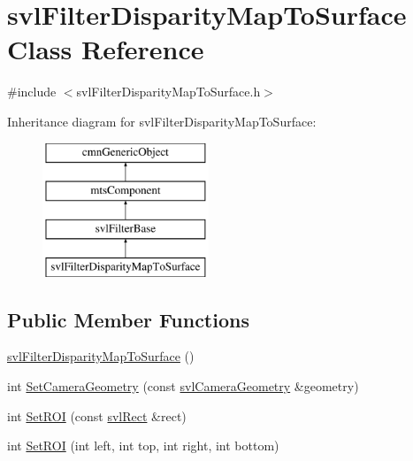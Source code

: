 \hypertarget{classsvl_filter_disparity_map_to_surface}{}\section{svl\+Filter\+Disparity\+Map\+To\+Surface Class Reference}
\label{classsvl_filter_disparity_map_to_surface}


{\ttfamily \#include $<$svl\+Filter\+Disparity\+Map\+To\+Surface.\+h$>$}

Inheritance diagram for svl\+Filter\+Disparity\+Map\+To\+Surface\+:\begin{figure}[H]
\begin{center}
\leavevmode
\includegraphics[height=4.000000cm]{dc/df1/classsvl_filter_disparity_map_to_surface}
\end{center}
\end{figure}
\subsection*{Public Member Functions}
\begin{DoxyCompactItemize}
\item 
\hyperlink{classsvl_filter_disparity_map_to_surface_af0416e86b3cdf61170a11ee63968bb28}{svl\+Filter\+Disparity\+Map\+To\+Surface} ()
\item 
int \hyperlink{classsvl_filter_disparity_map_to_surface_a21180672d1dc7fcf7eaef2656c0a56c0}{Set\+Camera\+Geometry} (const \hyperlink{classsvl_camera_geometry}{svl\+Camera\+Geometry} \&geometry)
\item 
int \hyperlink{classsvl_filter_disparity_map_to_surface_adcf2a1aaac3f0810de11ba63d3655326}{Set\+R\+O\+I} (const \hyperlink{structsvl_rect}{svl\+Rect} \&rect)
\item 
int \hyperlink{classsvl_filter_disparity_map_to_surface_a86d309b8caa98415ca8017a4938e8d4e}{Set\+R\+O\+I} (int left, int top, int right, int bottom)
\end{DoxyCompactItemize}
